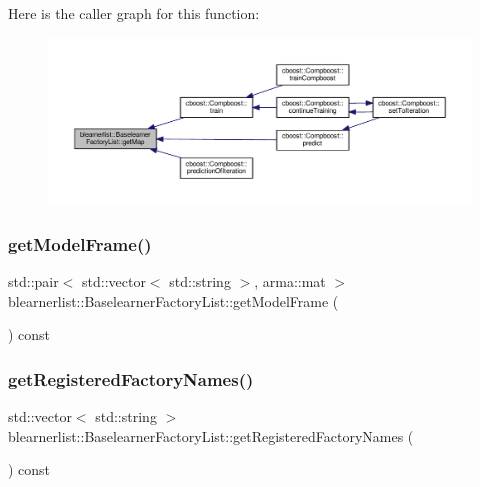 Here is the caller graph for this function\+:
\nopagebreak
\begin{figure}[H]
\begin{center}
\leavevmode
\includegraphics[width=350pt]{classblearnerlist_1_1_baselearner_factory_list_aeb573190a689af611e2f80ca8ed65d95_icgraph}
\end{center}
\end{figure}
\mbox{\label{classblearnerlist_1_1_baselearner_factory_list_a1f0d601a978c0f50cf9b6228c1f92ce8}} 
\subsubsection{\texorpdfstring{get\+Model\+Frame()}{getModelFrame()}}
{\footnotesize\ttfamily std\+::pair$<$ std\+::vector$<$ std\+::string $>$, arma\+::mat $>$ blearnerlist\+::\+Baselearner\+Factory\+List\+::get\+Model\+Frame (\begin{DoxyParamCaption}{ }\end{DoxyParamCaption}) const}

\mbox{\label{classblearnerlist_1_1_baselearner_factory_list_ac4dc76e908affe9aae7b7278cec22875}} 
\subsubsection{\texorpdfstring{get\+Registered\+Factory\+Names()}{getRegisteredFactoryNames()}}
{\footnotesize\ttfamily std\+::vector$<$ std\+::string $>$ blearnerlist\+::\+Baselearner\+Factory\+List\+::get\+Registered\+Factory\+Names (\begin{DoxyParamCaption}{ }\end{DoxyParamCaption}) const}

